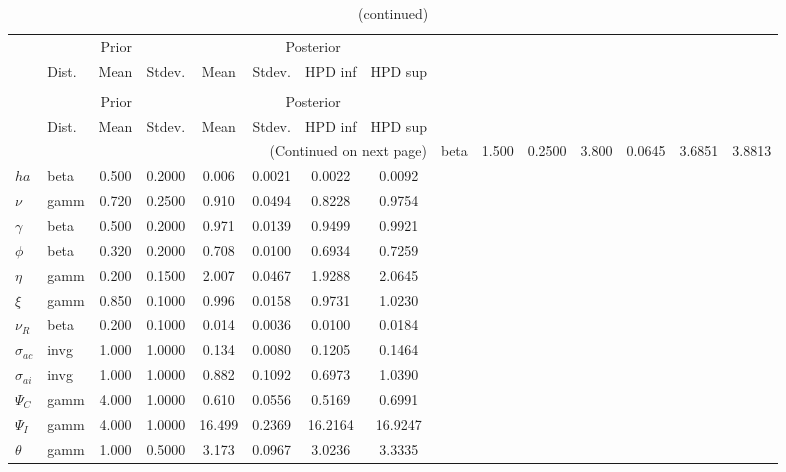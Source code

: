  
\begin{center}
\begin{longtable}{llcccccc} 
\caption{Results from Metropolis-Hastings (parameters)}
 \label{Table:MHPosterior:1}\\
\toprule 
  & \multicolumn{3}{c}{Prior}  &  \multicolumn{4}{c}{Posterior} \\
  \cmidrule(r{.75em}){2-4} \cmidrule(r{.75em}){5-8}
  & Dist. & Mean  & Stdev. & Mean & Stdev. & HPD inf & HPD sup\\
\midrule \endfirsthead 
\caption{(continued)}\\\toprule 
  & \multicolumn{3}{c}{Prior}  &  \multicolumn{4}{c}{Posterior} \\
  \cmidrule(r{.75em}){2-4} \cmidrule(r{.75em}){5-8}
  & Dist. & Mean  & Stdev. & Mean & Stdev. & HPD inf & HPD sup\\
\midrule \endhead 
\bottomrule \multicolumn{8}{r}{(Continued on next page)} \endfoot 
\bottomrule \endlastfoot 
${\sigma}$ & beta &   1.500 & 0.2500 &   3.800& 0.0645 &  3.6851 &  3.8813 \\ 
${ha}$ & beta &   0.500 & 0.2000 &   0.006& 0.0021 &  0.0022 &  0.0092 \\ 
$\nu$ & gamm &   0.720 & 0.2500 &   0.910& 0.0494 &  0.8228 &  0.9754 \\ 
$\gamma$ & beta &   0.500 & 0.2000 &   0.971& 0.0139 &  0.9499 &  0.9921 \\ 
${\phi}$ & beta &   0.320 & 0.2000 &   0.708& 0.0100 &  0.6934 &  0.7259 \\ 
${\eta}$ & gamm &   0.200 & 0.1500 &   2.007& 0.0467 &  1.9288 &  2.0645 \\ 
$\xi$ & gamm &   0.850 & 0.1000 &   0.996& 0.0158 &  0.9731 &  1.0230 \\ 
${\nu_R}$ & beta &   0.200 & 0.1000 &   0.014& 0.0036 &  0.0100 &  0.0184 \\ 
${\sigma_{ac}}$ & invg &   1.000 & 1.0000 &   0.134& 0.0080 &  0.1205 &  0.1464 \\ 
${\sigma_{ai}}$ & invg &   1.000 & 1.0000 &   0.882& 0.1092 &  0.6973 &  1.0390 \\ 
${\Psi_{C}}$ & gamm &   4.000 & 1.0000 &   0.610& 0.0556 &  0.5169 &  0.6991 \\ 
${\Psi_I}$ & gamm &   4.000 & 1.0000 &  16.499& 0.2369 & 16.2164 & 16.9247 \\ 
${\theta}$ & gamm &   1.000 & 0.5000 &   3.173& 0.0967 &  3.0236 &  3.3335 \\ 

\end{longtable}
\end{center}
